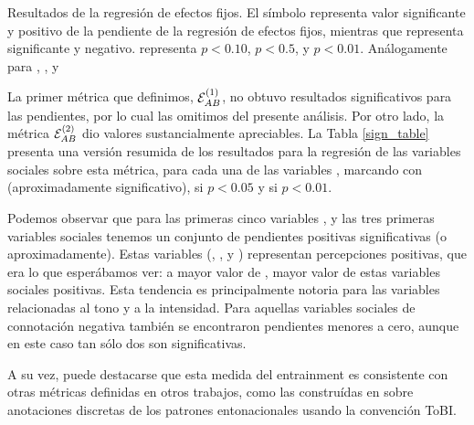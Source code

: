 
\begin{table}[t]

\caption{Resultados de la regresión de efectos fijos. El símbolo \psl representa valor significante y positivo de la pendiente de la regresión de efectos fijos, mientras que \nsl representa significante y negativo. \psl representa $p < 0.10$, \ppsl $p < 0.5$, y \pppsl $p < 0.01$. Análogamente para \nsl, \nnsl, y \nnnsl }
\label{sign_table}
\end{table}

\newcommand{\slopeestim}[1] { $\estslope \sim #1$ }

La primer métrica que definimos, $\mathcal{E}_{AB}^{(1)}$, no obtuvo resultados significativos para las pendientes, por lo cual las omitimos del presente análisis. Por otro lado, la métrica $\mathcal{E}_{AB}^{(2)}$ dio valores sustancialmente apreciables. La Tabla \ref{sign_table} presenta una versión resumida de los resultados para la regresión de las variables sociales sobre esta métrica, para cada una de las variables \ap, marcando con \psl (aproximadamente significativo), \ppsl si $p < 0.05$ y \pppsl si $p < 0.01$.

Podemos observar que para las primeras cinco variables \ap, y las tres primeras variables sociales tenemos un conjunto de pendientes positivas significativas (o aproximadamente). Estas variables (\svcontributes, \svclear, y \svengaged) representan percepciones positivas, que era lo que esperábamos ver: a mayor valor de \entrainment, mayor valor de estas variables sociales positivas. Esta tendencia es principalmente notoria para las variables \ap relacionadas al tono y a la intensidad. Para aquellas variables sociales de connotación negativa también se encontraron pendientes menores a cero, aunque en este caso tan sólo dos son significativas.

A su vez, puede destacarse que esta medida del entrainment es consistente con otras métricas definidas en otros trabajos, como las construídas en \cite{gravano2015backward} sobre anotaciones discretas de los patrones entonacionales usando la convención ToBI\cite{pitrelli1994evaluation}.
